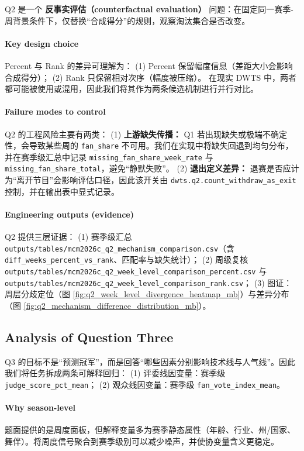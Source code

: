 Q2 是一个 \textbf{反事实评估（counterfactual evaluation）} 问题：在固定同一赛季-周背景条件下，仅替换“合成得分”的规则，观察淘汰集合是否改变。

\paragraph{Key design choice}
Percent 与 Rank 的差异可理解为：
(1) Percent 保留幅度信息（差距大小会影响合成得分）；
(2) Rank 只保留相对次序（幅度被压缩）。
在现实 DWTS 中，两者都可能被使用或混用，因此我们将其作为两条候选机制进行并行对比。

\paragraph{Failure modes to control}
Q2 的工程风险主要有两类：
(1) \textbf{上游缺失传播：} Q1 若出现缺失或极端不确定性，会导致某些周的 \texttt{fan\_share} 不可用。我们在实现中将缺失回退到均匀分布，并在赛季级汇总中记录 \texttt{missing\_fan\_share\_week\_rate} 与 \texttt{missing\_fan\_share\_total}，避免“静默失败”。
(2) \textbf{退出定义差异：} 退赛是否应计为“离开节目”会影响评估口径，因此该开关由 \texttt{dwts.q2.count\_withdraw\_as\_exit} 控制，并在输出表中显式记录。

\paragraph{Engineering outputs (evidence)}
Q2 提供三层证据：
(1) 赛季级汇总 \texttt{outputs/tables/mcm2026c\_q2\_mechanism\_comparison.csv}（含 \texttt{diff\_weeks\_percent\_vs\_rank}、匹配率与缺失统计）；
(2) 周级复核 \texttt{outputs/tables/mcm2026c\_q2\_week\_level\_comparison\_percent.csv} 与 \texttt{outputs/tables/mcm2026c\_q2\_week\_level\_comparison\_rank.csv}；
(3) 图证：周层分歧定位（图 \ref{fig:q2_week_level_divergence_heatmap_mb}）与差异分布（图 \ref{fig:q2_mechanism_difference_distribution_mb}）。

\subsection{Analysis of Question Three}

Q3 的目标不是“预测冠军”，而是回答“哪些因素分别影响技术线与人气线”。因此我们将任务拆成两条可解释回归：
(1) 评委线因变量：赛季级 \texttt{judge\_score\_pct\_mean}；
(2) 观众线因变量：赛季级 \texttt{fan\_vote\_index\_mean}。

\paragraph{Why season-level}
题面提供的是周度面板，但解释变量多为赛季静态属性（年龄、行业、州/国家、舞伴）。将周度信号聚合到赛季级别可以减少噪声，并使协变量含义更稳定。

